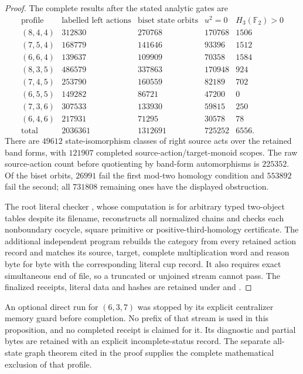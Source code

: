 \begin{proof}
The complete results after the stated analytic gates are
\[
\begin{array}{c|r|r|r|r}
\text{profile}&\text{labelled left actions}&\text{biset state orbits}
 &u^2=0&H_3(\mathbb F_2)>0\\\hline
(8,4,4)&312830&270768&170768&1506\\
(7,5,4)&168779&141646&93396&1512\\
(6,6,4)&139637&109909&70358&1584\\
(8,3,5)&486579&337863&170948&924\\
(7,4,5)&253790&160559&82189&702\\
(6,5,5)&149282&86721&47200&0\\
(7,3,6)&307533&133930&59815&250\\
(6,4,6)&217931&71295&30578&78\\\hline
\text{total}&2036361&1312691&725252&6556.
\end{array}
\]
There are $49612$ state-isomorphism classes of right source
acts over the retained band forms, with $121907$ completed
source-action/target-monoid scopes. The raw source-action count
before quotienting by band-form automorphisms is $225352$.
Of the biset orbits, $26991$ fail the first mod-two homology
condition and $553892$ fail the second; all $731808$ remaining
ones have the displayed obstruction.

The root literal checker
, whose computation
is for arbitrary typed two-object tables despite its filename,
reconstructs all normalized chains and checks each nonboundary
cocycle, square primitive or positive-third-homology certificate.
The additional independent program
 rebuilds the category
from every retained action record and matches its source,
target, complete multiplication word and reason byte for byte
with the corresponding literal cup record. It also requires
exact simultaneous end of file, so a truncated or unjoined
stream cannot pass. The finalized receipts, literal data and
hashes are retained under
 and
.
\end{proof}

\begin{remark*}
An optional direct run for $(6,3,7)$ was stopped by its explicit
centralizer memory guard before completion. No prefix of that
stream is used in this proposition, and no completed receipt
is claimed for it. Its diagnostic and partial bytes are
retained with an explicit incomplete-status record. The
separate all-state graph theorem cited in the proof supplies
the complete mathematical exclusion of that profile.
\end{remark*}
